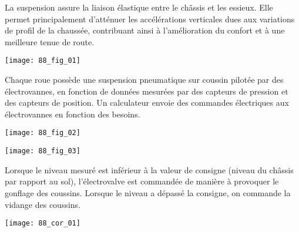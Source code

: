 \normaltrue \difficilefalse \tdifficilefalse
\correctionfalse

\setcounter{question}{0}
\ifcorrection
\else
{}
\fi



\ifprof
\else
La suspension assure la liaison élastique entre le châssis et les essieux. Elle permet principalement d’atténuer les accélérations verticales dues aux variations de profil de la chaussée, contribuant ainsi à l’amélioration du confort et à une meilleure tenue de route.

\begin{marginfigure}
\texttt{[image: 88\_fig\_01]}
\end{marginfigure}

Chaque roue possède une suspension pneumatique sur coussin pilotée par des électrovannes, en fonction de données mesurées par des capteurs de pression et des capteurs de position. Un calculateur envoie des commandes électriques aux électrovannes en fonction des besoins.

\begin{marginfigure}
\texttt{[image: 88\_fig\_02]}
\end{marginfigure}


\begin{center}
\texttt{[image: 88\_fig\_03]}
\end{center}

Lorsque le niveau mesuré est inférieur à la valeur de consigne (niveau du châssis par rapport au sol), l’électrovalve est commandée de manière à provoquer le gonflage des coussins.
Lorsque le niveau a dépassé la consigne, on commande la vidange des coussins.

\fi
{}
\ifprof
\begin{marginfigure}
\texttt{[image: 88\_cor\_01]}
\end{marginfigure}
\else
\fi

\ifprof
\else
{}
\fi